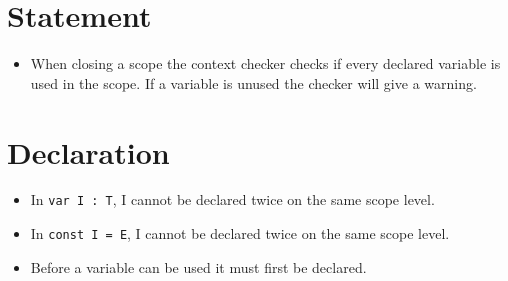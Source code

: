 \section{Statement}
\begin{itemize}
\item When closing a scope the context checker checks if every declared variable is used in the scope. If a variable is unused the checker will give a warning. 
\end{itemize}

\section{Declaration}
\begin{itemize}

\item In \texttt{var I : T}, I cannot be declared twice on the same scope level. 

\item In \texttt{const I = E}, I cannot be declared twice on the same scope level. 

\item Before a variable can be used it must first be declared.

\end{itemize}

